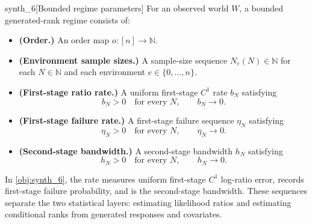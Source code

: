 \documentclass[11pt]{article}
\begin{document}
\begin{definitionv}{synth_6}[Bounded regime parameters]
For an observed world \(W\), a bounded generated-rank regime consists of:
\begin{itemize}
\item \textbf{(Order.)} An order map \(o:[n]\to\mathbb N\).
\item \textbf{(Environment sample sizes.)} A sample-size sequence \(N_e(N)\in\mathbb N\) for each \(N\in\mathbb N\) and each environment \(e\in\{0,\ldots,n\}\).
\item \textbf{(First-stage ratio rate.)} A uniform first-stage \(C^1\) rate \(b_N\) satisfying
\[
b_N>0\quad\text{for every }N,
\qquad
b_N\to 0.
\]
\item \textbf{(First-stage failure rate.)} A first-stage failure sequence \(\eta_N\) satisfying
\[
\eta_N>0\quad\text{for every }N,
\qquad
\eta_N\to 0.
\]
\item \textbf{(Second-stage bandwidth.)} A second-stage bandwidth \(h_N\) satisfying
\[
h_N>0\quad\text{for every }N,
\qquad
h_N\to 0.
\]
\end{itemize}
\end{definitionv}

In \cref{obj:synth_6}, the rate  measures uniform first-stage \(C^1\) log-ratio error,  records first-stage failure probability, and  is the second-stage bandwidth. These sequences separate the two statistical layers: estimating likelihood ratios and estimating conditional ranks from generated responses and covariates.
\end{document}
